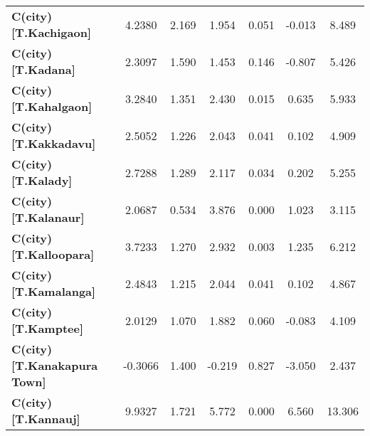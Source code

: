 \begin{center}
\begin{tabular}{lcccccc}
\textbf{C(city)[T.Kachigaon]}                                                                       &       4.2380  &        2.169     &     1.954  &         0.051        &       -0.013    &        8.489     \\
\textbf{C(city)[T.Kadana]}                                                                          &       2.3097  &        1.590     &     1.453  &         0.146        &       -0.807    &        5.426     \\
\textbf{C(city)[T.Kahalgaon]}                                                                       &       3.2840  &        1.351     &     2.430  &         0.015        &        0.635    &        5.933     \\
\textbf{C(city)[T.Kakkadavu]}                                                                       &       2.5052  &        1.226     &     2.043  &         0.041        &        0.102    &        4.909     \\
\textbf{C(city)[T.Kalady]}                                                                          &       2.7288  &        1.289     &     2.117  &         0.034        &        0.202    &        5.255     \\
\textbf{C(city)[T.Kalanaur]}                                                                        &       2.0687  &        0.534     &     3.876  &         0.000        &        1.023    &        3.115     \\
\textbf{C(city)[T.Kalloopara]}                                                                      &       3.7233  &        1.270     &     2.932  &         0.003        &        1.235    &        6.212     \\
\textbf{C(city)[T.Kamalanga]}                                                                       &       2.4843  &        1.215     &     2.044  &         0.041        &        0.102    &        4.867     \\
\textbf{C(city)[T.Kamptee]}                                                                         &       2.0129  &        1.070     &     1.882  &         0.060        &       -0.083    &        4.109     \\
\textbf{C(city)[T.Kanakapura Town]}                                                                 &      -0.3066  &        1.400     &    -0.219  &         0.827        &       -3.050    &        2.437     \\
\textbf{C(city)[T.Kannauj]}                                                                         &       9.9327  &        1.721     &     5.772  &         0.000        &        6.560    &       13.306     \\

\end{tabular}
\end{center}
